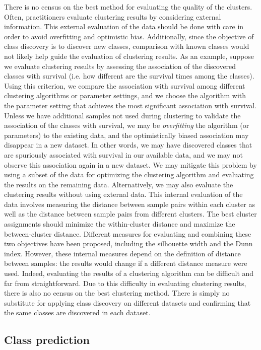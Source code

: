 There is no census on the best method for evaluating the quality of the clusters. Often, practitioners evaluate clustering results by considering external information. This external evaluation of the data should be done with care in order to avoid overfitting and optimistic bias. Additionally, since the objective of class discovery is to discover new classes, comparison with known classes would not likely help guide the evaluation of clustering results. As an example, suppose we evaluate clustering results by assessing the association of the discovered classes with survival (i.e. how different are the survival times among the classes). Using this criterion, we compare the association with survival among different clustering algorithms or parameter settings, and we choose the algorithm with the parameter setting that achieves the most significant association with survival. Unless we have additional samples not used during clustering to validate the association of the classes with survival, we may be \emph{overfitting} the algorithm (or parameters) to the existing data, and the optimistically biased association may disappear in a new dataset. In other words, we may have discovered classes that are spuriously associated with survival in our available data, and we may not observe this association again in a new dataset. We may mitigate this problem by using a subset of the data for optimizing the clustering algorithm and evaluating the results on the remaining data. Alternatively, we may also evaluate the clustering results without using external data. This internal evaluation of the data involves measuring the distance between sample pairs within each cluster as well as the distance between sample pairs from different clusters. The best cluster assignments should minimize the within-cluster distance and maximize the between-cluster distance. Different measures for evaluating and combining these two objectives have been proposed, including the silhouette width and the Dunn index. However, these internal measures depend on the definition of distance between samples: the results would change if a different distance measure were used. Indeed, evaluating the results of a clustering algorithm can be difficult and far from straightforward. Due to this difficulty in evaluating clustering results, there is also no census on the best clustering method. There is simply no substitute for applying class discovery on different datasets and confirming that the same classes are discovered in each dataset.

\subsection{Class prediction}

